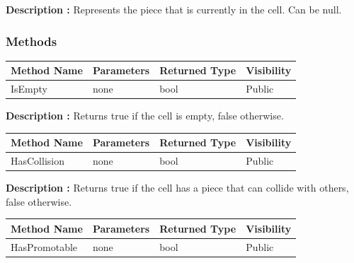 \documentclass[12pt]{article}
\begin{document}
    \textbf{Description :} Represents the piece that is currently in the cell. Can be null.

    \subsubsection{Methods}

    \begin{table}[H]
        \begin{tabular}{|l|l|l|l|}
            \hline
            \rowcolor[HTML]{EFEFEF}
            \cellcolor[HTML]{EFEFEF}\textbf{Method Name} & \textbf{Parameters} & \textbf{Returned Type} & \textbf{Visibility} \\ \hline
            IsEmpty                                      & none                & bool                   & Public              \\ \hline
        \end{tabular}
    \end{table}

    \textbf{Description :} Returns true if the cell is empty, false otherwise.

    \begin{table}[H]
        \begin{tabular}{|l|l|l|l|}
            \hline
            \rowcolor[HTML]{EFEFEF}
            \cellcolor[HTML]{EFEFEF}\textbf{Method Name} & \textbf{Parameters} & \textbf{Returned Type} & \textbf{Visibility} \\ \hline
            HasCollision                                 & none                & bool                   & Public              \\ \hline
        \end{tabular}
    \end{table}

    \textbf{Description :} Returns true if the cell has a piece that can collide with others, false otherwise.

    \begin{table}[H]
        \begin{tabular}{|l|l|l|l|}
            \hline
            \rowcolor[HTML]{EFEFEF}
            \cellcolor[HTML]{EFEFEF}\textbf{Method Name} & \textbf{Parameters} & \textbf{Returned Type} & \textbf{Visibility} \\ \hline
            HasPromotable                                & none                & bool                   & Public              \\ \hline
        \end{tabular}
    \end{table}
\end{document}
